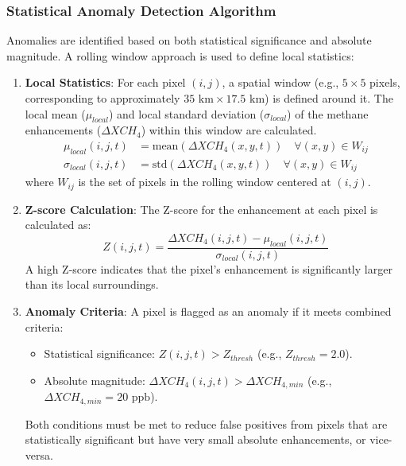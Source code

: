 \documentclass[12pt,a4paper]{article}
\begin{document}
\subsubsection{Statistical Anomaly Detection Algorithm}
Anomalies are identified based on both statistical significance and absolute magnitude. A rolling window approach is used to define local statistics:
\begin{enumerate}
    \item \textbf{Local Statistics}: For each pixel $(i,j)$, a spatial window (e.g., $5 \times 5$ pixels, corresponding to approximately $35 \text{ km} \times 17.5 \text{ km}$) is defined around it. The local mean ($\mu_{local}$) and local standard deviation ($\sigma_{local}$) of the methane enhancements ($\Delta XCH_4$) within this window are calculated.
    \begin{align}
        \mu_{local}(i,j,t) &= \text{mean}(\Delta XCH_4(x,y,t)) \quad \forall (x,y) \in W_{ij} \\
        \sigma_{local}(i,j,t) &= \text{std}(\Delta XCH_4(x,y,t)) \quad \forall (x,y) \in W_{ij}
    \end{align}
    where $W_{ij}$ is the set of pixels in the rolling window centered at $(i,j)$.

    \item \textbf{Z-score Calculation}: The Z-score for the enhancement at each pixel is calculated as:
    \begin{equation}
        Z(i,j,t) = \frac{\Delta XCH_4(i,j,t) - \mu_{local}(i,j,t)}{\sigma_{local}(i,j,t)}
        \label{eq:zscore}
    \end{equation}
    A high Z-score indicates that the pixel's enhancement is significantly larger than its local surroundings.

    \item \textbf{Anomaly Criteria}: A pixel is flagged as an anomaly if it meets combined criteria:
    \begin{itemize}
        \item Statistical significance: $Z(i,j,t) > Z_{thresh}$ (e.g., $Z_{thresh} = 2.0$).
        \item Absolute magnitude: $\Delta XCH_4(i,j,t) > \Delta XCH_{4,min}$ (e.g., $\Delta XCH_{4,min} = 20 \text{ ppb}$).
    \end{itemize}
    Both conditions must be met to reduce false positives from pixels that are statistically significant but have very small absolute enhancements, or vice-versa.
\end{enumerate}
\end{document}
